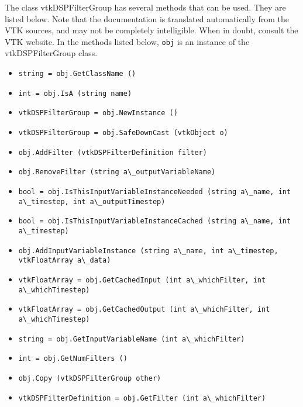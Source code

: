 The class vtkDSPFilterGroup has several methods that can be used.
  They are listed below.
Note that the documentation is translated automatically from the VTK sources,
and may not be completely intelligible.  When in doubt, consult the VTK website.
In the methods listed below, \verb|obj| is an instance of the vtkDSPFilterGroup class.
\begin{itemize}
\item  \verb|string = obj.GetClassName ()|

\item  \verb|int = obj.IsA (string name)|

\item  \verb|vtkDSPFilterGroup = obj.NewInstance ()|

\item  \verb|vtkDSPFilterGroup = obj.SafeDownCast (vtkObject o)|

\item  \verb|obj.AddFilter (vtkDSPFilterDefinition filter)|

\item  \verb|obj.RemoveFilter (string a\_outputVariableName)|

\item  \verb|bool = obj.IsThisInputVariableInstanceNeeded (string a\_name, int a\_timestep, int a\_outputTimestep)|

\item  \verb|bool = obj.IsThisInputVariableInstanceCached (string a\_name, int a\_timestep)|

\item  \verb|obj.AddInputVariableInstance (string a\_name, int a\_timestep, vtkFloatArray a\_data)|

\item  \verb|vtkFloatArray = obj.GetCachedInput (int a\_whichFilter, int a\_whichTimestep)|

\item  \verb|vtkFloatArray = obj.GetCachedOutput (int a\_whichFilter, int a\_whichTimestep)|

\item  \verb|string = obj.GetInputVariableName (int a\_whichFilter)|

\item  \verb|int = obj.GetNumFilters ()|

\item  \verb|obj.Copy (vtkDSPFilterGroup other)|

\item  \verb|vtkDSPFilterDefinition = obj.GetFilter (int a\_whichFilter)|

\end{itemize}
